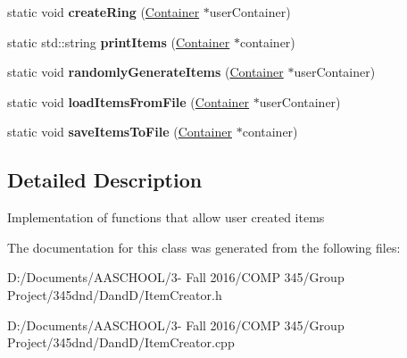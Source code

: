 \begin{DoxyCompactItemize}
static void {\bfseries create\+Ring} (\hyperlink{class_container}{Container} $\ast$user\+Container)
\item 
\hypertarget{class_item_creator_ae6b6257edbd112c048ab3eb81cf74dfe}{}\label{class_item_creator_ae6b6257edbd112c048ab3eb81cf74dfe} 
static std\+::string {\bfseries print\+Items} (\hyperlink{class_container}{Container} $\ast$container)
\item 
\hypertarget{class_item_creator_a5a330139eda75050c3e73e4f52a99922}{}\label{class_item_creator_a5a330139eda75050c3e73e4f52a99922} 
static void {\bfseries randomly\+Generate\+Items} (\hyperlink{class_container}{Container} $\ast$user\+Container)
\item 
\hypertarget{class_item_creator_a770669739995465669cb608800e9721d}{}\label{class_item_creator_a770669739995465669cb608800e9721d} 
static void {\bfseries load\+Items\+From\+File} (\hyperlink{class_container}{Container} $\ast$user\+Container)
\item 
\hypertarget{class_item_creator_a79b6c45316c5e6309ae8a19ce788045b}{}\label{class_item_creator_a79b6c45316c5e6309ae8a19ce788045b} 
static void {\bfseries save\+Items\+To\+File} (\hyperlink{class_container}{Container} $\ast$container)
\end{DoxyCompactItemize}


\subsection{Detailed Description}
Implementation of functions that allow user created items 

The documentation for this class was generated from the following files\+:\begin{DoxyCompactItemize}
\item 
D\+:/\+Documents/\+A\+A\+S\+C\+H\+O\+O\+L/3-\/ Fall 2016/\+C\+O\+M\+P 345/\+Group Project/345dnd/\+Dand\+D/Item\+Creator.\+h\item 
D\+:/\+Documents/\+A\+A\+S\+C\+H\+O\+O\+L/3-\/ Fall 2016/\+C\+O\+M\+P 345/\+Group Project/345dnd/\+Dand\+D/Item\+Creator.\+cpp\end{DoxyCompactItemize}
